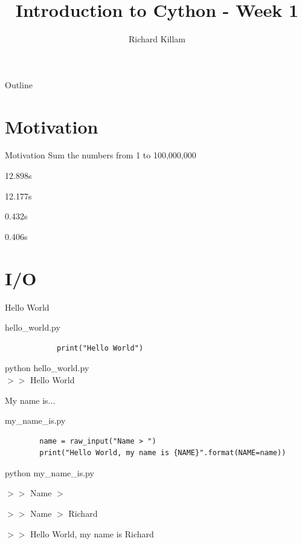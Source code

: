 \documentclass[11pt]{beamer}
\author{Richard Killam}
\title{Introduction to Cython - Week 1}
\newcommand{\emptyline}{$ $\\}
\begin{document}
\centering

\begin{frame}
	\titlepage
\end{frame}

\begin{frame}{Outline}
	\begin{multicols}{2}
		\tableofcontents
	\end{multicols}
\end{frame}

\section{Motivation}
\begin{frame}{Motivation}
	Sum the numbers from 1 to 100,000,000

	\begin{description}[style=multiline,topsep=10pt]
		\item[Python] 12.898s
		\item[Compiled Python] 12.177s
		\item[Cython] 0.432s
		\item[C] 0.406s
	\end{description}
\end{frame}

\section{I/O}
\begin{frame}[fragile]{Hello World}
	\begin{minipage}{0.45\linewidth}
		hello\_world.py
		\begin{lstlisting}
			print("Hello World")
		\end{lstlisting}
	\end{minipage}
	\pause
	\begin{minipage}{0.45\linewidth}
		python hello\_world.py
		\emptyline
		$>>$ Hello World
	\end{minipage}
\end{frame}

\begin{frame}[fragile]{My name is...}
	\raggedright
	my\_name\_is.py
	\begin{lstlisting}
		name = raw_input("Name > ")
		print("Hello World, my name is {NAME}".format(NAME=name))
	\end{lstlisting}

	\pause

	python my\_name\_is.py

	$>>$ Name $>$

	$>>$ Name $>$ Richard

	$>>$ Hello World, my name is Richard

\end{frame}
\end{document}
